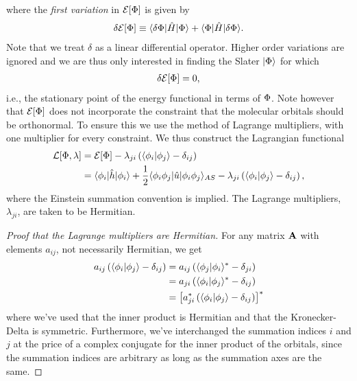         where the \emph{first variation} in $\mathcal{E}[\Phi]$ is given by
        \begin{align}
            \delta\mathcal{E}[\Phi]
            \equiv
            \langle \delta\Phi |\hat{H}| \Phi \rangle + \langle \Phi |\hat{H}| \delta\Phi \rangle.
        \end{align}
        Note that we treat $\delta$ as a linear differential operator. Higher
        order variations are ignored and we are thus only interested in finding
        the Slater $| \Phi \rangle$ for which
        \begin{align}
            \delta\mathcal{E}[\Phi] = 0,
        \end{align}
        i.e., the stationary point of the energy functional in terms of $\Phi$.
        Note however that $\mathcal{E}[\Phi]$ does not incorporate the
        constraint that the molecular orbitals should be orthonormal. To ensure
        this we use the method of Lagrange multipliers, with one multiplier for
        every constraint. We thus construct the Lagrangian functional
        \begin{align}
            \mathcal{L}[\Phi, \lambda]
            &= \mathcal{E}[\Phi]
            - \lambda_{ji}\left( 
                \langle \phi_i | \phi_j \rangle
                - \delta_{ij}
             \right)
            \\
            &=
            \langle \phi_i |\hat{h}| \phi_i \rangle
            + \frac{1}{2}\langle \phi_i\phi_j |\hat{u}| \phi_i\phi_j \rangle_{AS}
            - \lambda_{ji}\left( 
                \langle \phi_i | \phi_j \rangle
                - \delta_{ij}
             \right),
        \end{align}
        where the Einstein summation convention is implied. The Lagrange
        multipliers, $\lambda_{ji}$, are taken to be Hermitian.

        \begin{proof}[Proof that the Lagrange multipliers are Hermitian]
            For any matrix $\mathbf{A}$ with elements $a_{ij}$, not necessarily
            Hermitian, we get
            \begin{align}
                a_{ij}\left( 
                    \langle \phi_i | \phi_j \rangle - \delta_{ij}
                 \right)
                &= a_{ij}\left( 
                    \langle \phi_j | \phi_i \rangle^{*} - \delta_{ji}
                 \right)
                \\
                &= a_{ji}\left( 
                    \langle \phi_i | \phi_j \rangle^{*} - \delta_{ij}
                 \right)
                \\
                &= \left[ 
                    a_{ji}^{*}\left( 
                        \langle \phi_i | \phi_j \rangle - \delta_{ij}
                     \right)
                 \right]^{*}
            \end{align}
            where we've used that the inner product is Hermitian and that the
            Kronecker-Delta is symmetric. Furthermore, we've interchanged the
            summation indices $i$ and $j$ at the price of a complex conjugate
            for the inner product of the orbitals, since the summation indices
            are arbitrary as long as the summation axes are the same.
        \end{proof}
